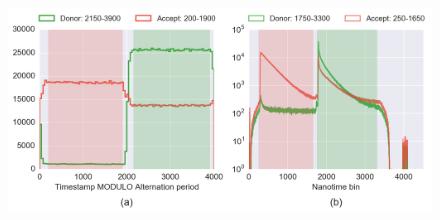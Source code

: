 


\author{Antonino Ingargiola}
\title{}


\verbatimfont{\small}
\lstset{language=Python}

\maketitle

\begin{abstract}

\end{abstract}

\tableofcontents







\begin{figure}
\begin{center}
\includegraphics[width=\doublefig]{"figures/ALEX_alternation_double/ALEX_alternation_double"}
\caption[]{}
\end{center}
\end{figure}





